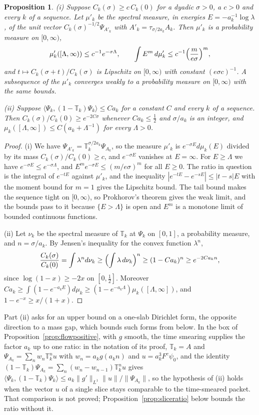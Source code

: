\documentclass[11pt]{amsart}
\newtheorem{proposition}[theorem]{Proposition}
\theoremstyle{definition}
\theoremstyle{remark}
\numberwithin{equation}{section}
\newcommand{\ip}[2]{\langle #1,#2\rangle}
\begin{document}
\begin{proposition}\label{prop:flowshift}
\textup{(i)} Suppose $C_k(\sigma)\ge c\,C_k(0)$ for a dyadic $\sigma>0$, a
$c>0$ and every $k$ of a sequence. Let $\mu'_k$ be the spectral measure, in
energies $E=-a_k^{-1}\log\lambda$, of the unit vector
$C_k(\sigma)^{-1/2}\Psi_{A'_k}$ with $A'_k=\tau_{\sigma/2a_k}A_k$. Then
$\mu'_k$ is a probability measure on $[0,\infty)$,
\[
\mu'_k([\Lambda,\infty))\le c^{-1}e^{-\sigma\Lambda},\qquad
\int E^m\,d\mu'_k\le c^{-1}\Bigl(\frac m{e\sigma}\Bigr)^m ,
\]
and $t\mapsto C_k(\sigma+t)/C_k(\sigma)$ is Lipschitz on $[0,\infty)$ with
constant $(e\sigma c)^{-1}$. A subsequence of the $\mu'_k$ converges weakly to
a probability measure on $[0,\infty)$ with the same bounds.

\textup{(ii)} Suppose $\ip{\Psi_k}{(1-\mathbb T_k)\Psi_k}\le Ca_k$ for a
constant $C$ and every $k$ of a sequence. Then
$C_k(\sigma)/C_k(0)\ge e^{-2C\sigma}$ whenever $Ca_k\le\frac12$ and
$\sigma/a_k$ is an integer, and $\mu_k([\Lambda,\infty])\le C(a_k+\Lambda^{-1})$
for every $\Lambda>0$.
\end{proposition}

\begin{proof}
(i) We have $\Psi_{A'_k}=\mathbb T_k^{\sigma/2a_k}\Psi_{A_k}$, so the
measure $\mu'_k$ is $e^{-\sigma E}d\mu_k(E)$ divided by its mass
$C_k(\sigma)/C_k(0)\ge c$, and $e^{-\sigma E}$ vanishes at $E=\infty$. For
$E\ge\Lambda$ we have $e^{-\sigma E}\le e^{-\sigma\Lambda}$, and
$E^me^{-\sigma E}\le(m/e\sigma)^m$ for all $E\ge0$. The ratio in question is
the integral of $e^{-tE}$ against $\mu'_k$, and the inequality
$|e^{-tE}-e^{-sE}|\le|t-s|E$ with the moment bound for $m=1$ gives the
Lipschitz bound. The tail bound makes the sequence tight on
$[0,\infty)$, so Prokhorov's theorem gives the weak limit, and the bounds pass
to it because $\{E>\Lambda\}$ is open and $E^m$ is a monotone limit of bounded
continuous functions.

(ii) Let $\nu_k$ be the spectral measure of $\mathbb T_k$ at $\Psi_k$ on
$[0,1]$, a probability measure, and $n=\sigma/a_k$. By Jensen's inequality for
the convex function $\lambda^n$,
\[
\frac{C_k(\sigma)}{C_k(0)}=\int\lambda^nd\nu_k\ge\Bigl(\int\lambda\,d\nu_k
\Bigr)^n\ge(1-Ca_k)^n\ge e^{-2Ca_kn},
\]
since $\log(1-x)\ge-2x$ on $[0,\frac12]$. Moreover $Ca_k\ge\int(1-e^{-a_kE})
d\mu_k\ge(1-e^{-a_k\Lambda})\mu_k([\Lambda,\infty])$, and
$1-e^{-x}\ge x/(1+x)$.
\end{proof}

Part (ii) asks for an upper bound on a one-slab Dirichlet form, the opposite
direction to a mass gap, which bounds such forms from below. In the box of
Proposition~\ref{prop:flowpositive}, with $g$ smooth, the time smearing
supplies the factor $a_k$ up to one ratio: in the notation of its proof,
$\mathbb T_k=A$ and $\Psi_{A_k}=\sum_nw_n\mathbb T_k^nu$ with
$w_n=a_kg(a_kn)$ and $u=a_k^3F^c\psi_0$, and the identity $(1-\mathbb T_k)
\Psi_{A_k}=\sum_n(w_n-w_{n-1})\mathbb T_k^nu$ gives
$\ip{\Psi_k}{(1-\mathbb T_k)\Psi_k}\le a_k\|g'\|_{L^1}\|u\|/\|\Psi_{A_k}\|$, so
the hypothesis of (ii) holds when the vector $u$ of a single slice stays
comparable to the time-smeared packet. That comparison is not proved;
Proposition~\ref{prop:sliceratio} below bounds the ratio without it.
\end{document}
